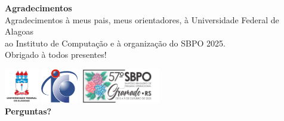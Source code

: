 \documentclass[aspectratio=169,11pt]{beamer}
\begin{document}
\begin{frame}[plain]
    \begin{center}
        {\Large\textbf{Agradecimentos}}\\[0.5cm]
        
        Agradecimentos à meus pais, meus orientadores, à Universidade Federal de Alagoas\\
        ao Instituto de Computação e à organização do SBPO 2025\@.\\[0.7cm]

        Obrigado à todos presentes!
        
        \includegraphics[height=1.5cm]{img/ufal.jpg}\hspace{0.5cm}%
        \includegraphics[height=1.5cm]{img/logo-ic.png}\hspace{0.5cm}%
        \includegraphics[height=1.5cm]{img/sbpo2025-header-logo.png}\\[0.7cm]
        
        {\Huge\textbf{Perguntas?}}
    \end{center}
\end{frame}
\end{document}
